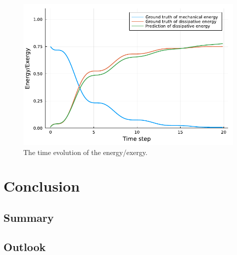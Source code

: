 \documentclass[
	parskip, 			   %
	twoside, 			   %
	DIV=14, 			   %
	BCOR=15.0mm, 		   %
	headsepline, 		   %
	open=right, 		   %
	captions=tableheading, %
	bibliography=totoc,    %
	numbers=noenddot       %
]{scrreprt}
\begin{document}
\begin{figure}[h!]
    \centering
    \includegraphics[scale=1]{figures/idho_energy_evolution.pdf}
    \caption{The time evolution of the energy/exergy.}
    \label{fig:idho_energy_evolution}
\end{figure}


\clearpage
\chapter{Conclusion}
\label{ch:chapter8}
\section{Summary}
\section{Outlook}



\renewcommand{\bibname}{References} %



\appendix
\end{document}
